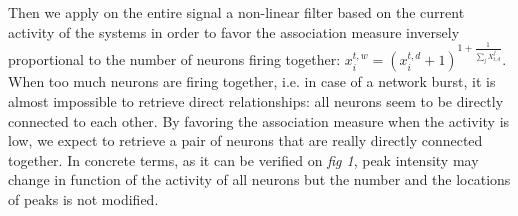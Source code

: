 \documentclass[wcp]{jmlr}
\begin{document}
Then we apply on the entire signal a non-linear filter based on the
current activity of the systems in order to favor the association measure inversely
proportional to the number of neurons firing together:
$ x^{t,w}_i  = (x^{t,d}_i + 1 )^{1 + \frac{1}{\sum_{j} X_{t,d}^j}} $.
When too much neurons are firing together, i.e. in case of a network burst, it is almost
impossible to retrieve direct relationships: all neurons seem to be directly
connected to each other. By favoring the association measure when the activity is low,
we expect to retrieve a pair of neurons that are really directly connected together.
In concrete terms, as it can be verified on \textit{fig 1}, peak intensity may change in function
of the activity of all neurons but the number and the locations of peaks is not modified.








\end{document}
